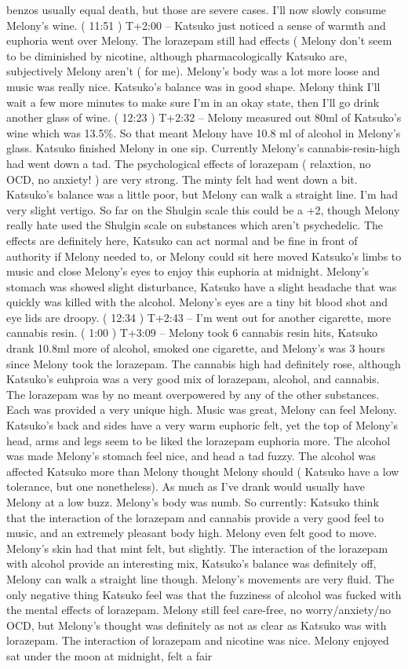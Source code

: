 \documentclass[12pt]{book}
\begin{document}
benzos usually equal death, but those are severe cases. I'll now slowly consume Melony's wine. ( 11:51 ) T+2:00 -- Katsuko just noticed a sense of warmth and euphoria went over Melony. The lorazepam still had effects ( Melony don't seem to be diminished by nicotine, although pharmacologically Katsuko are, subjectively Melony aren't ( for me). Melony's body was a lot more loose and music was really nice. Katsuko's balance was in good shape. Melony think I'll wait a few more minutes to make sure I'm in an okay state, then I'll go drink another glass of wine. ( 12:23 ) T+2:32 -- Melony measured out 80ml of Katsuko's wine which was 13.5\%. So that meant Melony have 10.8 ml of alcohol in Melony's glass. Katsuko finished Melony in one sip. Currently Melony's cannabis-resin-high had went down a tad. The psychological effects of lorazepam ( relaxtion, no OCD, no anxiety! ) are very strong. The minty felt had went down a bit. Katsuko's balance was a little poor, but Melony can walk a straight line. I'm had very slight vertigo. So far on the Shulgin scale this could be a +2, though Melony really hate used the Shulgin scale on substances which aren't psychedelic. The effects are definitely here, Katsuko can act normal and be fine in front of authority if Melony needed to, or Melony could sit here moved Katsuko's limbs to music and close Melony's eyes to enjoy this euphoria at midnight. Melony's stomach was showed slight disturbance, Katsuko have a slight headache that was quickly was killed with the alcohol. Melony's eyes are a tiny bit blood shot and eye lids are droopy. ( 12:34 ) T+2:43 -- I'm went out for another cigarette, more cannabis resin. ( 1:00 ) T+3:09 -- Melony took 6 cannabis resin hits, Katsuko drank 10.8ml more of alcohol, smoked one cigarette, and Melony's was 3 hours since Melony took the lorazepam. The cannabis high had definitely rose, although Katsuko's euhproia was a very good mix of lorazepam, alcohol, and cannabis. The lorazepam was by no meant overpowered by any of the other substances. Each was provided a very unique high. Music was great, Melony can feel Melony. Katsuko's back and sides have a very warm euphoric felt, yet the top of Melony's head, arms and legs seem to be liked the lorazepam euphoria more. The alcohol was made Melony's stomach feel nice, and head a tad fuzzy. The alcohol was affected Katsuko more than Melony thought Melony should ( Katsuko have a low tolerance, but one nonetheless). As much as I've drank would usually have Melony at a low buzz. Melony's body was numb. So currently: Katsuko think that the interaction of the lorazepam and cannabis provide a very good feel to music, and an extremely pleasant body high. Melony even felt good to move. Melony's skin had that mint felt, but slightly. The interaction of the lorazepam with alcohol provide an interesting mix, Katsuko's balance was definitely off, Melony can walk a straight line though. Melony's movements are very fluid. The only negative thing Katsuko feel was that the fuzziness of alcohol was fucked with the mental effects of lorazepam. Melony still feel care-free, no worry/anxiety/no OCD, but Melony's thought was definitely as not as clear as Katsuko was with lorazepam. The interaction of lorazepam and nicotine was nice. Melony enjoyed sat under the moon at midnight, felt a fair 
\end{document}
